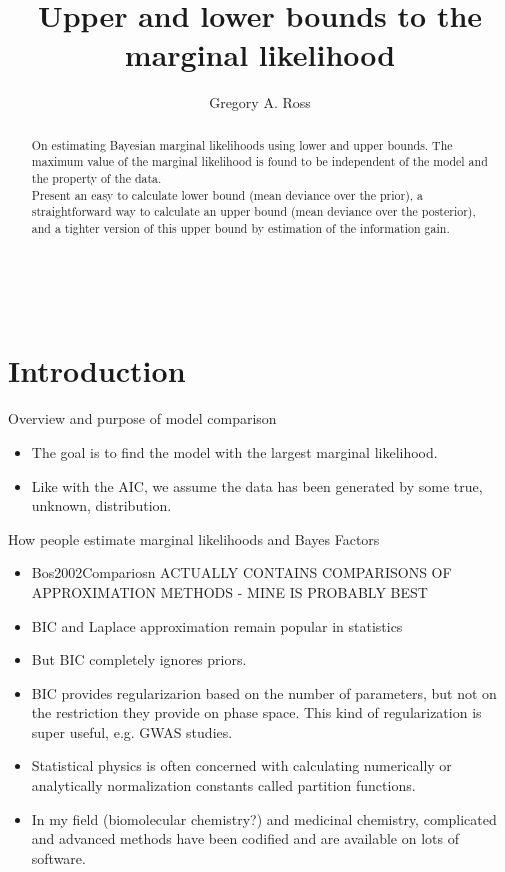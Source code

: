\documentclass[10pt,a4paper]{article}
\author{Gregory A. Ross}
\title{Upper and lower bounds to the marginal likelihood}
\begin{document}
\newcommand{\myrightarrow}[1]{\xrightarrow{\makebox[2em][c]{$\scriptstyle#1$}}}‌


\maketitle
\begin{abstract}
On estimating Bayesian marginal likelihoods using lower and upper bounds. The maximum value of the marginal likelihood is found to be independent of the model and the property of the data.\\

Present an easy to calculate lower bound (mean deviance over the prior), a straightforward way to calculate an upper bound (mean deviance over the posterior), and a tighter version of this upper bound by estimation of the information gain. 
\end{abstract}

\section{Introduction}

Overview and purpose of model comparison
\begin{itemize}
\item The goal is to find the model with the largest marginal likelihood.
\item Like with the AIC, we assume the data has been generated by some true, unknown, distribution.
\end{itemize}


How people estimate marginal likelihoods and Bayes Factors
\begin{itemize}
\item Bos2002Compariosn ACTUALLY CONTAINS COMPARISONS OF APPROXIMATION METHODS - MINE IS PROBABLY BEST
\item BIC and Laplace approximation remain popular in statistics
\item But BIC completely ignores priors. 
\item BIC provides regularizarion based on the number of parameters, but not on the restriction they provide on phase space. This kind of regularization is super useful, e.g. GWAS studies.
\item Statistical physics is often concerned with calculating numerically or analytically normalization constants called partition functions.
\item In my field (biomolecular chemistry?) and medicinal chemistry, complicated and advanced methods have been codified and are available on lots of software.
\end{itemize}
\end{document}
